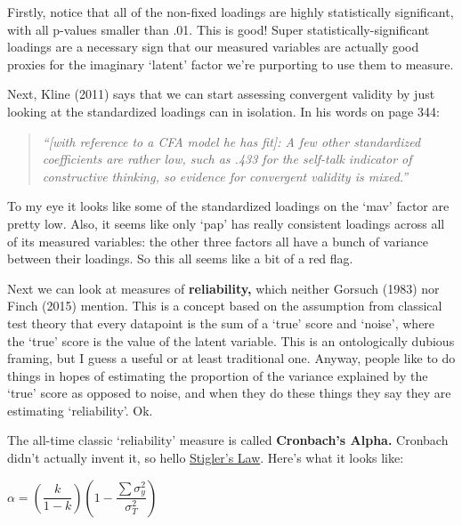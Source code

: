 \documentclass[
  letterpaper,
  DIV=11,
  numbers=noendperiod]{scrreprt}
\begin{document}
Firstly, notice that all of the non-fixed loadings are highly
statistically significant, with all p-values smaller than .01. This is
good! Super statistically-significant loadings are a necessary sign that
our measured variables are actually good proxies for the imaginary
`latent' factor we're purporting to use them to measure.

Next, Kline (2011) says that we can start assessing convergent validity
by just looking at the standardized loadings can in isolation. In his
words on page 344:

\begin{quote}
\emph{``{[}with reference to a CFA model he has fit{]}: A few other
standardized coefficients are rather low, such as .433 for the self-talk
indicator of constructive thinking, so evidence for convergent validity
is mixed.''}
\end{quote}

To my eye it looks like some of the standardized loadings on the `mav'
factor are pretty low. Also, it seems like only `pap' has really
consistent loadings across all of its measured variables: the other
three factors all have a bunch of variance between their loadings. So
this all seems like a bit of a red flag.

Next we can look at measures of \textbf{reliability,} which neither
Gorsuch (1983) nor Finch (2015) mention. This is a concept based on the
assumption from classical test theory that every datapoint is the sum of
a `true' score and `noise', where the `true' score is the value of the
latent variable. This is an ontologically dubious framing, but I guess a
useful or at least traditional one. Anyway, people like to do things in
hopes of estimating the proportion of the variance explained by the
`true' score as opposed to noise, and when they do these things they say
they are estimating `reliability'. Ok.

The all-time classic `reliability' measure is called \textbf{Cronbach's
Alpha.} Cronbach didn't actually invent it, so hello
\href{https://en.wikipedia.org/wiki/Stigler\%27s_law_of_eponymy}{Stigler's
Law}. Here's what it looks like:

\(\alpha = (\dfrac{k}{1-k}) (1 - \dfrac{\sum\sigma_y^2}{\sigma_T^2})\)
\end{document}
